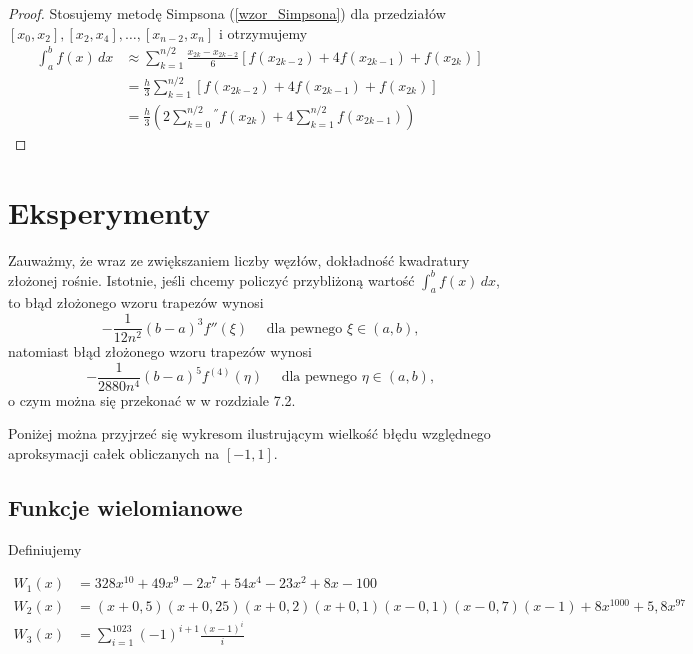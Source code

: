 \documentclass{article}
\theoremstyle{definition}
\begin{document}
\begin{proof}
     Stosujemy metodę Simpsona (\ref{wzor_Simpsona}) dla przedziałów \([x_0, x_2], [x_2, x_4], \ldots, [x_{n-2}, x_n]\) i otrzymujemy
     \begin{align*}
         \int_a^b f(x) \,dx &\approx \sum_{k=1}^{n/2} \frac{x_{2k} - x_{2k-2}}{6} \left[ f(x_{2k-2}) + 4f(x_{2k-1}) + f(x_{2k}) \right] \\
         &= \frac{h}{3} \sum_{k=1}^{n/2} \left[ f(x_{2k-2}) + 4f(x_{2k-1}) + f(x_{2k}) \right] \\
         &= \frac{h}{3} \left( 2\sum_{k=0}^{n/2}{}^{''} f(x_{2k}) +  4\sum_{k=1}^{n/2} f(x_{2k-1}) \right)
     \end{align*}
\end{proof}



\section{Eksperymenty}
\label{roz:eksperymenty}

Zauważmy, że wraz ze zwiększaniem liczby węzłów, dokładność kwadratury złożonej rośnie. Istotnie, jeśli chcemy policzyć przybliżoną wartość \(\int_{a}^{b} f(x) \,dx\), to błąd złożonego wzoru trapezów wynosi
\[
    -\frac{1}{12n^2}(b-a)^3f''(\xi) \quad \text{ dla pewnego } \xi \in (a,b) \text{,}
\]
natomiast błąd złożonego wzoru trapezów wynosi
\[
    -\frac{1}{2880n^4}(b-a)^5f^{(4)}(\eta) \quad \text{ dla pewnego } \eta \in (a,b) \text{,}
\]
o czym można się przekonać w \cite{kincaid} w rozdziale 7.2.

\medskip 

\noindent Poniżej można przyjrzeć się wykresom ilustrującym wielkość błędu względnego aproksymacji całek obliczanych na \([-1,1]\).

\subsection{Funkcje wielomianowe}

Definiujemy

\begin{align*}
    W_1(x) &=  328x^{10} + 49x^9 - 2x^7 + 54x^4 - 23x^2 + 8x - 100 \\
    W_2(x) &= (x+0,5)(x+0,25)(x+0,2)(x+0,1)(x-0,1)(x-0,7)(x-1) + 8x^{1000} + 5,8x^{97} \\
    W_3(x) &= \sum_{i=1}^{1023} (-1)^{i+1}\frac{(x-1)^i}{i}
\end{align*}
\end{document}
